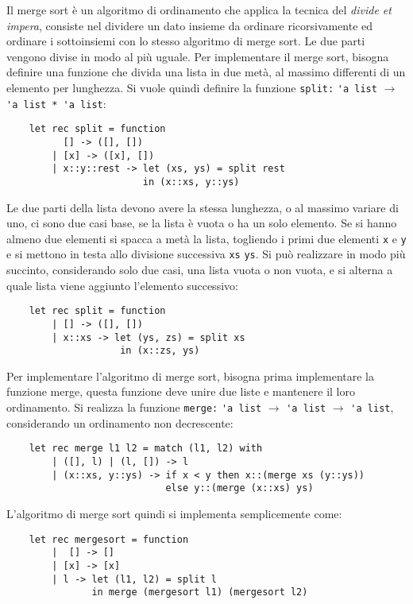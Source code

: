 \documentclass{article}
\numberwithin{equation}{subsection}
\begin{document}
Il merge sort è un algoritmo di ordinamento che applica la tecnica del \textit{divide et impera}, consiste nel dividere un dato insieme da ordinare ricorsivamente ed ordinare i sottoinsiemi con lo stesso algoritmo di merge sort. Le due parti vengono divise in modo al più uguale. 
Per implementare il merge sort, bisogna definire una funzione che divida una lista in due metà, al massimo differenti di un elemento per lunghezza. 
Si vuole quindi definire la funzione \verb|split:| \verb|'a list| $\rightarrow$ \verb|'a list * 'a list|:
\begin{verbatim}
    let rec split = function
          [] -> ([], [])
        | [x] -> ([x], [])
        | x::y::rest -> let (xs, ys) = split rest
                        in (x::xs, y::ys)
\end{verbatim}
Le due parti della lista devono avere la stessa lunghezza, o al massimo variare di uno, ci sono due casi base, se la lista è vuota o ha un solo elemento. Se si hanno almeno due elementi si spacca a metà la lista, togliendo i primi due elementi \verb|x| e \verb|y| e si mettono in testa allo divisione successiva \verb|xs| \verb|ys|. 
Si può realizzare in modo più succinto, considerando solo due casi, una lista vuota o non vuota, e si alterna a quale lista viene aggiunto l'elemento successivo:
\begin{verbatim}
    let rec split = function
        | [] -> ([], [])
        | x::xs -> let (ys, zs) = split xs
                    in (x::zs, ys)
\end{verbatim}
Per implementare l'algoritmo di merge sort, bisogna prima implementare la funzione merge, questa funzione deve unire due liste e mantenere il loro ordinamento. Si realizza la funzione \verb|merge:| \verb|'a list| $\rightarrow$ \verb|'a list| $\rightarrow$ \verb|'a list|, considerando un ordinamento non decrescente:
\begin{verbatim}
    let rec merge l1 l2 = match (l1, l2) with
        | ([], l) | (l, []) -> l
        | (x::xs, y::ys) -> if x < y then x::(merge xs (y::ys))
                            else y::(merge (x::xs) ys)
\end{verbatim}
L'algoritmo di merge sort quindi si implementa semplicemente come:
\begin{verbatim}
    let rec mergesort = function
        |  [] -> []
        | [x] -> [x]
        | l -> let (l1, l2) = split l
               in merge (mergesort l1) (mergesort l2)
\end{verbatim}

\clearpage
\end{document}
